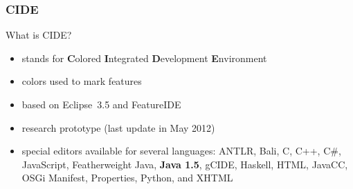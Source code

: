 \subsubsection*{CIDE}
\begin{frame}{\myframetitle\mysource{\cide}}
	\begin{mycolumns}[widths={60},animation=none]
	\mynextcolumn
		\begin{example}{What is CIDE?}
			\begin{itemize}
				\item stands for \textbf{C}olored \textbf{I}ntegrated \textbf{D}evelopment \textbf{E}nvironment
				\item colors used to mark features
				\item based on Eclipse~3.5 and FeatureIDE
				\item research prototype (last update in May 2012)
				\item special editors available for several languages:
				ANTLR, Bali, C, C++, C\#, JavaScript, Featherweight Java, \textbf{Java 1.5}, gCIDE, Haskell, HTML, JavaCC, OSGi Manifest, Properties, Python, and XHTML
			\end{itemize}
		\end{example}
	\end{mycolumns}
\end{frame}

